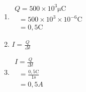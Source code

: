 {\begin{mdframed}[linewidth=4, leftmargin=40, rightmargin=40]
\begin{exercise}
\begin{enumerate}[noitemsep, label=\textbf{Step} \textbf{\arabic*}. ]
\begin{math}\Delta t=1\phantom{\rule{2pt}{0ex}}s\end{math}\par \label{m38773*id1171060421643}\item 
    \label{m38773*id1171064282112}
\begin{math}\begin{array}{ccc}Q=500\ensuremath{\times}{10}^{3}\mathrm{\mu C}\\ \phantom{x}=500\ensuremath{\times}{10}^{3}\ensuremath{\times}{10}^{-6}\mathrm{C}\\ \phantom{x}=0,5\mathrm{C}\end{array}\end{math}\par \label{m38773*id1171073988790}\item 
    \label{m38773*id1171070413749}
\begin{math}I=\frac{Q}{\Delta t}\end{math}\par \label{m38773*id1171058642138}\item 
    \label{m38773*id1171065081814}
\begin{math}\begin{array}{ccc}I=\frac{Q}{\Delta t}\\ \phantom{x}=\frac{0,5\mathrm{C}}{1\mathrm{s}}\\ \phantom{x}=0,5A\end{array}\end{math}\par \end{enumerate}
        
    \end{exercise}
    \end{mdframed}
    }
    \noindent
  
    
\par
            \label{m38773*exid004}\vspace{.5cm} 
      
